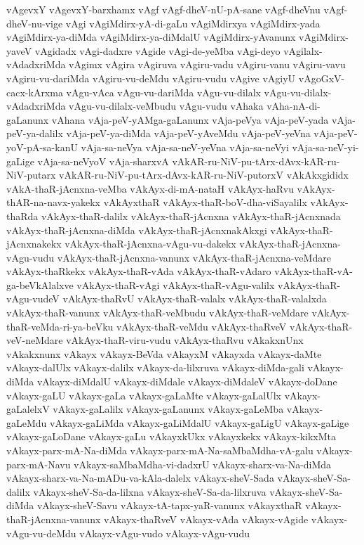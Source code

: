 {vAgevxY
vAgevxY-barxhamx
vAgf
vAgf-dheV-nU-pA-sane
vAgf-dheVnu
vAgf-dheV-nu-vige
vAgi
vAgiMdirx-yA-di-gaLu
vAgiMdirxya
vAgiMdirx-yada
vAgiMdirx-ya-diMda
vAgiMdirx-ya-diMdalU
vAgiMdirx-yAvanunx
vAgiMdirx-yaveV
vAgidadx
vAgi-dadxre
vAgide
vAgi-de-yeMba
vAgi-deyo
vAgilalx-vAdadxriMda
vAgimx
vAgira
vAgiruva
vAgiru-vadu
vAgiru-vanu
vAgiru-vavu
vAgiru-vu-dariMda
vAgiru-vu-deMdu
vAgiru-vudu
vAgive
vAgiyU
vAgoGxV-cacx-kArxma
vAgu-vAca
vAgu-vu-dariMda
vAgu-vu-dilalx
vAgu-vu-dilalx-vAdadxriMda
vAgu-vu-dilalx-veMbudu
vAgu-vudu
vAhaka
vAha-nA-di-gaLanunx
vAhana
vAja-peV-yAMga-gaLanunx
vAja-peVya
vAja-peV-yada
vAja-peV-ya-dalilx
vAja-peV-ya-diMda
vAja-peV-yAveMdu
vAja-peV-yeVna
vAja-peV-yoV-pA-sa-kanU
vAja-sa-neVya
vAja-sa-neV-yeVna
vAja-sa-neVyi
vAja-sa-neV-yi-gaLige
vAja-sa-neVyoV
vAja-sharxvA
vAkAR-ru-NiV-pu-tArx-dAvx-kAR-ru-NiV-putarx
vAkAR-ru-NiV-pu-tArx-dAvx-kAR-ru-NiV-putorxV
vAkAkxgididx
vAkA-thaR-jAcnxna-veMba
vAkAyx-di-mA-nataH
vAkAyx-haRvu
vAkAyx-thAR-na-navx-yakekx
vAkAyxthaR
vAkAyx-thaR-boV-dha-viSayalilx
vAkAyx-thaRda
vAkAyx-thaR-dalilx
vAkAyx-thaR-jAcnxna
vAkAyx-thaR-jAcnxnada
vAkAyx-thaR-jAcnxna-diMda
vAkAyx-thaR-jAcnxnakAkxgi
vAkAyx-thaR-jAcnxnakekx
vAkAyx-thaR-jAcnxna-vAgu-vu-dakekx
vAkAyx-thaR-jAcnxna-vAgu-vudu
vAkAyx-thaR-jAcnxna-vanunx
vAkAyx-thaR-jAcnxna-veMdare
vAkAyx-thaRkekx
vAkAyx-thaR-vAda
vAkAyx-thaR-vAdaro
vAkAyx-thaR-vA-ga-beVkAlalxve
vAkAyx-thaR-vAgi
vAkAyx-thaR-vAgu-valilx
vAkAyx-thaR-vAgu-vudeV
vAkAyx-thaRvU
vAkAyx-thaR-valalx
vAkAyx-thaR-valalxda
vAkAyx-thaR-vanunx
vAkAyx-thaR-veMbudu
vAkAyx-thaR-veMdare
vAkAyx-thaR-veMda-ri-ya-beVku
vAkAyx-thaR-veMdu
vAkAyx-thaRveV
vAkAyx-thaR-veV-neMdare
vAkAyx-thaR-viru-vudu
vAkAyx-thaRvu
vAkakxnUnx
vAkakxnunx
vAkayx
vAkayx-BeVda
vAkayxM
vAkayxda
vAkayx-daMte
vAkayx-dalUlx
vAkayx-dalilx
vAkayx-da-lilxruva
vAkayx-diMda-gali
vAkayx-diMda
vAkayx-diMdalU
vAkayx-diMdale
vAkayx-diMdaleV
vAkayx-doDane
vAkayx-gaLU
vAkayx-gaLa
vAkayx-gaLaMte
vAkayx-gaLalUlx
vAkayx-gaLalelxV
vAkayx-gaLalilx
vAkayx-gaLanunx
vAkayx-gaLeMba
vAkayx-gaLeMdu
vAkayx-gaLiMda
vAkayx-gaLiMdalU
vAkayx-gaLigU
vAkayx-gaLige
vAkayx-gaLoDane
vAkayx-gaLu
vAkayxkUkx
vAkayxkekx
vAkayx-kikxMta
vAkayx-parx-mA-Na-diMda
vAkayx-parx-mA-Na-saMbaMdha-vA-galu
vAkayx-parx-mA-Navu
vAkayx-saMbaMdha-vi-dadxrU
vAkayx-sharx-va-Na-diMda
vAkayx-sharx-va-Na-mADu-va-kAla-dalelx
vAkayx-sheV-Sada
vAkayx-sheV-Sa-dalilx
vAkayx-sheV-Sa-da-lilxna
vAkayx-sheV-Sa-da-lilxruva
vAkayx-sheV-Sa-diMda
vAkayx-sheV-Savu
vAkayx-tA-tapx-yaR-vanunx
vAkayxthaR
vAkayx-thaR-jAcnxna-vanunx
vAkayx-thaRveV
vAkayx-vAda
vAkayx-vAgide
vAkayx-vAgu-vu-deMdu
vAkayx-vAgu-vudo
vAkayx-vAgu-vudu
}
